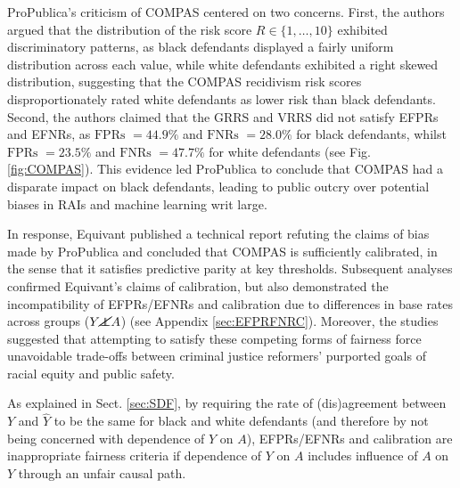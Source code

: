 \documentclass[runningheads]{llncs}
\newcommand{\figref}[1]{Fig. \ref{#1}}
\newcommand{\secref}[1]{Sect. \ref{#1}}
\newcommand{\appref}[1]{Appendix \ref{#1}}
\newcommand\independent{\protect\mathpalette{\protect\independenT}{\perp}}
\def\independenT#1#2{\mathrel{\rlap{$#1#2$}\mkern2mu{#1#2}}}
\begin{document}
ProPublica’s criticism of COMPAS centered on two concerns. First, the authors argued that the distribution of the risk score $R\in\{1,\ldots,10\}$ exhibited discriminatory patterns, as black defendants displayed a fairly uniform distribution across each value, while white defendants exhibited a right skewed distribution, suggesting that the COMPAS recidivism risk scores disproportionately rated white defendants as lower risk than black defendants. Second, the authors claimed that the GRRS and VRRS did not satisfy EFPRs and EFNRs, as $\textrm{FPRs }=44.9\%$ and $\textrm{FNRs }=28.0\%$ for black defendants, whilst $\textrm{FPRs }=23.5\%$ and $\textrm{FNRs }=47.7\%$ for white defendants (see \figref{fig:COMPAS}). 
This evidence led ProPublica to conclude that COMPAS had a disparate impact on black defendants, leading to public outcry over potential biases in RAIs and machine learning writ large.

In response, Equivant published a technical report \cite{dieterich16compas} refuting the claims of bias made by ProPublica and concluded that COMPAS is sufficiently calibrated, in the sense that it satisfies  predictive parity at key thresholds. 
Subsequent analyses \cite{chouldechova17fair,corbett-davies17algorithmic,kleinberg16inherent} confirmed Equivant’s claims of calibration, but also demonstrated the incompatibility of EFPRs/EFNRs and calibration due to differences in base rates across groups ($Y\cancel{\independent} A$) (see \appref{sec:EFPRFNRC}). Moreover, the studies suggested that attempting to satisfy these competing forms of fairness force unavoidable trade-offs between criminal justice reformers’ purported goals of racial equity and public safety.

As explained in \secref{sec:SDF}, by requiring the rate of (dis)agreement between $Y$ and $\hat Y$ to be the same for black and white defendants (and therefore by not being concerned with dependence of $Y$ on $A$), EFPRs/EFNRs and calibration are inappropriate fairness criteria if dependence of $Y$ on $A$ includes influence of $A$ on $Y$ through an unfair causal path.  
\end{document}
